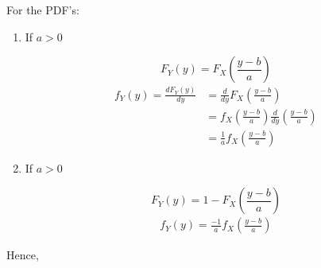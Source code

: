 \documentclass{article}
\begin{document}
\begin{itemize}
\begin{enumerate}
        For the PDF's:
        \begin{enumerate}
            \item If $a>0$

            $$ F_Y(y)= F_X\left( \frac{y-b}{a}\right)$$
            \begin{align*}
                f_Y(y)= \frac{dF_Y(y)}{dy} &= \frac{d}{dy}F_X\left( \frac{y-b}{a} \right)\\
                &= f_X \left( \frac{y-b}{a} \right)\frac{d}{dy}\left(\frac{y-b}{a} \right) \\
                &= \frac{1}{a}f_X\left(\frac{y-b}{a} \right)
            \end{align*}

            \item If $a>0$

            $$ F_Y(y)= 1- F_X\left( \frac{y-b}{a} \right)$$
            \begin{align*}
                f_Y(y)= \frac{-1}{a}f_X\left(\frac{y-b}{a} \right)
            \end{align*}


        \end{enumerate}

        Hence,
    \end{enumerate}
\end{itemize}
\end{document}
